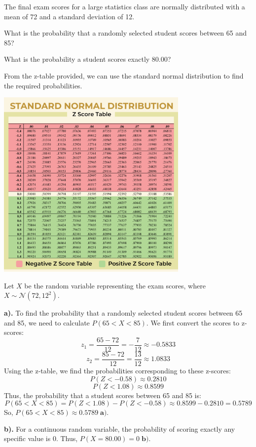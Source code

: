 \documentclass[a4paper, 10pt]{article}
\begin{document}
\begin{tosubmit}
\problem
The final exam scores for a large statistics class are normally distributed with a
mean of 72 and a standard deviation of 12.
\begin{subproblems}
    \item What is the probability that a randomly selected student scores between 65 and 85?
    \item What is the probability a student scores exactly 80.00?
\end{subproblems}

\par\noindent\submitsolution
From the z-table provided, we can use the standard normal distribution to find the required probabilities.
\begin{center}
    \includegraphics[width=0.70\textwidth]{Images/z-score.png}
\end{center}

Let \( X \) be the random variable representing the exam scores, where \( X \sim \mathcal{N}(72, 12^2) \).

\vspace{2mm}

\textbf{a).} To find the probability that a randomly selected student scores between 65 and 85, we need to calculate \( P(65 < X < 85) \).
We first convert the scores to z-scores:
\[ z_1 = \frac{65 - 72}{12} = -\frac{7}{12} \approx -0.5833 \]
\[ z_2 = \frac{85 - 72}{12} = \frac{13}{12} \approx 1.0833 \]
Using the z-table, we find the probabilities corresponding to these z-scores:
\[ P(Z < -0.58) \approx 0.2810 \]
\[ P(Z < 1.08) \approx 0.8599 \]
Thus, the probability that a student scores between 65 and 85 is:
\[ P(65 < X < 85) = P(Z < 1.08) - P(Z < -0.58) \approx 0.8599 - 0.2810 = 0.5789 \]
So, \( P(65 < X < 85) \approx \boxed{0.5789} \; \textbf{a).} \)

\vspace{2mm}

\textbf{b).} For a continuous random variable, the probability of scoring exactly any specific value is 0.
Thus, \( P(X = 80.00) = \boxed{0} \;\textbf{b).} \)
\end{tosubmit}
\end{document}
